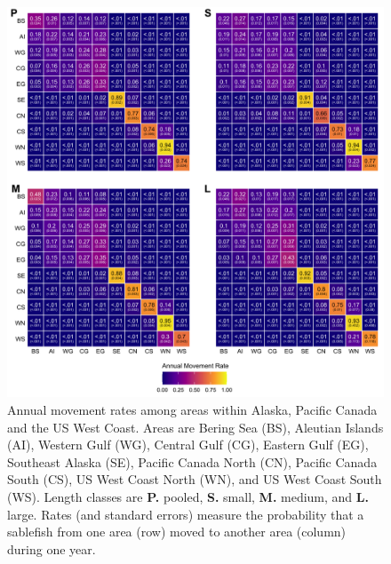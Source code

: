 \documentclass{article}
\begin{document}
\begin{figure}[htb]
    \centering
    \includegraphics[width = \textwidth]{figs/heat-movement-10a-static}
    \caption{Annual movement rates among areas within Alaska, Pacific Canada and the US West Coast. Areas are Bering Sea (BS), Aleutian Islands (AI), Western Gulf (WG), Central Gulf (CG), Eastern Gulf (EG), Southeast Alaska (SE), Pacific Canada North (CN), Pacific Canada South (CS), US West Coast North (WN), and US West Coast South (WS). Length classes are \textbf{P.} pooled, \textbf{S.} small, \textbf{M.} medium, and \textbf{L.} large. Rates (and standard errors) measure the probability that a sablefish from one area (row) moved to another area (column) during one year.}
    \label{fig:heat-movement-10a-static}
\end{figure}

\end{document}
